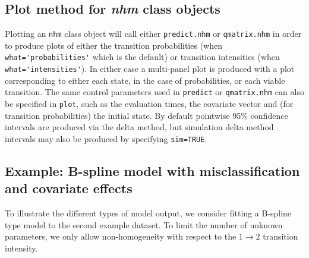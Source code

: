 \documentclass{article}
\numberwithin{equation}{section}
\begin{document}
\subsection{Plot method for {\it nhm} class objects}

Plotting an \verb!nhm! class object will call either \verb!predict.nhm! or \verb!qmatrix.nhm! in order to produce plots of either the transition probabilities (when \verb!what='probabilities'! which is the default) or transition intensities (when \verb!what='intensities'!). In either case a multi-panel plot is produced with a plot corresponding to either each state, in the case of probabilities, or each viable transition. The same control parameters used in \verb!predict! or \verb!qmatrix.nhm! can also be specified in \verb!plot!, such as the evaluation times, the covariate vector and (for transition probabilities) the initial state. By default pointwise 95\% confidence intervals are produced via the delta method, but simulation delta method intervals may also be produced by specifying \verb!sim=TRUE!.

\subsection{Example: B-spline model with misclassification and covariate effects}
\label{sec:bspline_example}

To illustrate the different types of model output, we consider fitting a B-spline type model to the second example dataset. To limit the number of unknown parameters, we only allow non-homogeneity with respect to the $1 \rightarrow 2$ transition intensity.
\end{document}
